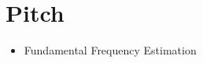 \setcounter{chapter}{1}
\chapter{Pitch}
\thispagestyle{plain}



\begin{corollary}

	\hspace*{10mm}
	
	\vspace{5mm} %
	
	\begin{itemize}
			\item Fundamental Frequency Estimation

	\end{itemize}
\end{corollary}

\newpage









